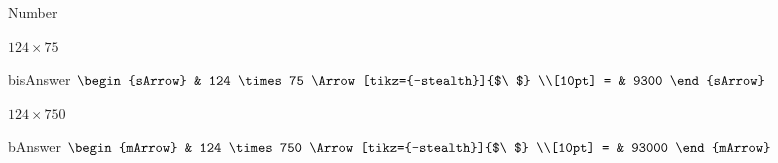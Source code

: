 \begin{boxSkill}{Number}
\begin{tasks}
    \task $124 \times 75$
              \begin{envOut}[equal height group=A]{bisAnswer}
			       $\begin{sArrow}
			             & 124 \times 75                  \Arrow[tikz={-stealth}]{$\ $} \\[10pt]
                       = & 9300              
	                \end{sArrow}$
              \end{envOut}

    \task $124 \times 750$
              \begin{envOut}[equal height group=A]{bAnswer}
			       $\begin{mArrow}
			             & 124 \times 750               \Arrow[tikz={-stealth}]{$\ $} \\[10pt]
                       = & 93000              
	                \end{mArrow}$
              \end{envOut}

  \end{tasks}
\end{boxSkill}




